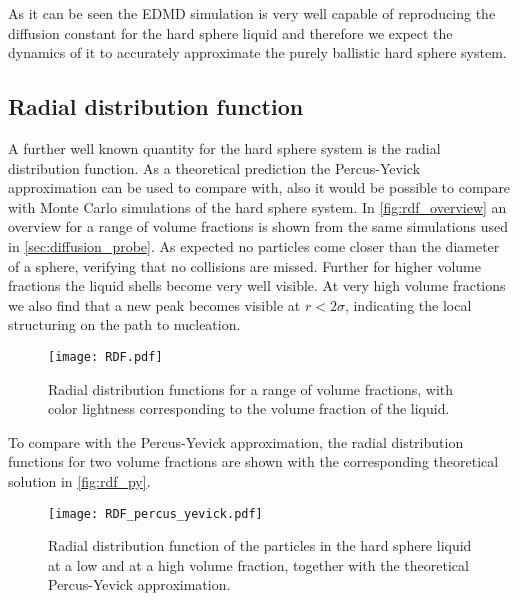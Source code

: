 As it can be seen the EDMD simulation is very well capable of reproducing the diffusion constant for the hard sphere liquid and therefore we expect the dynamics of it to accurately approximate the purely ballistic hard sphere system.

\subsection{Radial distribution function}
\label{sec:RDF_prob}
A further well known quantity for the hard sphere system is the radial distribution function. As a theoretical prediction the Percus-Yevick approximation can be used to compare with, also it would be possible to compare with Monte Carlo simulations of the hard sphere system. In \autoref{fig:rdf_overview} an overview for a range of volume fractions is shown from the same simulations used in \autoref{sec:diffusion_probe}. As expected no particles come closer than the diameter of a sphere, verifying that no collisions are missed. Further for higher volume fractions the liquid shells become very well visible. At very high volume fractions we also find that a new peak becomes visible at $r < 2 \sigma$, indicating the local structuring on the path to nucleation.
\begin{figure}[h]
\centering
\texttt{[image: RDF.pdf]}
\caption[Radial distribution functions at varying volume fractions]{Radial distribution functions for a range of volume fractions, with color lightness corresponding to the volume fraction of the liquid.}
\label{fig:rdf_overview}
\end{figure}
To compare with the Percus-Yevick approximation, the radial distribution functions for two volume fractions are shown with the corresponding theoretical solution in \autoref{fig:rdf_py}.
\begin{figure}[h]
\centering
\texttt{[image: RDF\_percus\_yevick.pdf]}
\caption[Radial distribution function with Percus-Yevick approximation]{Radial distribution function of the particles in the hard sphere liquid at a low and at a high volume fraction, together with the theoretical Percus-Yevick approximation.}
\label{fig:rdf_py}
\end{figure}
